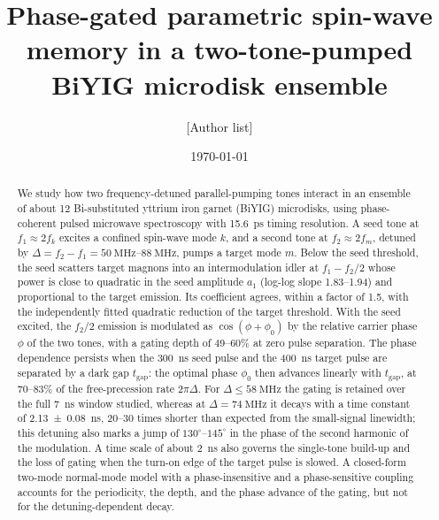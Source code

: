 \documentclass[aps,prb,reprint,superscriptaddress,floatfix]{revtex4-2}
\newcommand{\tgap}{t_{\mathrm{gap}}}
\begin{document}
\title{Phase-gated parametric spin-wave memory in a two-tone-pumped BiYIG microdisk ensemble}

\author{[Author list]}
\affiliation{[Affiliations]}

\date{\today}

\begin{abstract}
We study how two frequency-detuned parallel-pumping tones interact in an ensemble of about 12 Bi-substituted yttrium iron garnet (BiYIG) microdisks, using phase-coherent pulsed microwave spectroscopy with \SI{15.6}{\pico\second} timing resolution. A seed tone at $f_1\approx 2f_k$ excites a confined spin-wave mode $k$, and a second tone at $f_2\approx 2f_m$, detuned by $\Delta=f_2-f_1=\SIrange{50}{88}{\mega\hertz}$, pumps a target mode $m$. Below the seed threshold, the seed scatters target magnons into an intermodulation idler at $f_1-f_2/2$ whose power is close to quadratic in the seed amplitude $a_1$ (log-log slope 1.83--1.94) and proportional to the target emission. Its coefficient agrees, within a factor of 1.5, with the independently fitted quadratic reduction of the target threshold. With the seed excited, the $f_2/2$ emission is modulated as $\cos(\phi+\phi_0)$ by the relative carrier phase $\phi$ of the two tones, with a gating depth of 49--60\% at zero pulse separation. The phase dependence persists when the \SI{300}{\nano\second} seed pulse and the \SI{400}{\nano\second} target pulse are separated by a dark gap $\tgap$: the optimal phase $\phi_0$ then advances linearly with $\tgap$, at 70--83\% of the free-precession rate $2\pi\Delta$. For $\Delta\le\SI{58}{\mega\hertz}$ the gating is retained over the full \SI{7}{\nano\second} window studied, whereas at $\Delta=\SI{74}{\mega\hertz}$ it decays with a time constant of \SI{2.13+-0.08}{\nano\second}, 20--30 times shorter than expected from the small-signal linewidth; this detuning also marks a jump of $130^\circ$--$145^\circ$ in the phase of the second harmonic of the modulation. A time scale of about \SI{2}{\nano\second} also governs the single-tone build-up and the loss of gating when the turn-on edge of the target pulse is slowed. A closed-form two-mode normal-mode model with a phase-insensitive and a phase-sensitive coupling accounts for the periodicity, the depth, and the phase advance of the gating, but not for the detuning-dependent decay.
\end{abstract}

\maketitle
\end{document}
